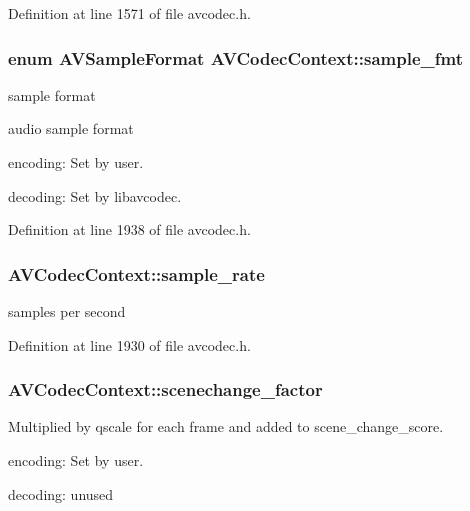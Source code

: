 Definition at line 1571 of file avcodec.\+h.

\subsubsection[{\texorpdfstring{sample\+\_\+fmt}{sample_fmt}}]{\setlength{\rightskip}{0pt plus 5cm}enum {\bf A\+V\+Sample\+Format} A\+V\+Codec\+Context\+::sample\+\_\+fmt}\hypertarget{struct_a_v_codec_context_a1bdba69ea111e2a9d03fdaa7a46a4c45}{}\label{struct_a_v_codec_context_a1bdba69ea111e2a9d03fdaa7a46a4c45}


sample format 

audio sample format
\begin{DoxyItemize}
\item encoding\+: Set by user.
\item decoding\+: Set by libavcodec. 
\end{DoxyItemize}

Definition at line 1938 of file avcodec.\+h.

\subsubsection[{\texorpdfstring{sample\+\_\+rate}{sample_rate}}]{ A\+V\+Codec\+Context\+::sample\+\_\+rate}\hypertarget{struct_a_v_codec_context_a8ff0b000c463361e234af48d03aadfc0}{}\label{struct_a_v_codec_context_a8ff0b000c463361e234af48d03aadfc0}


samples per second 



Definition at line 1930 of file avcodec.\+h.

\subsubsection[{\texorpdfstring{scenechange\+\_\+factor}{scenechange_factor}}]{ A\+V\+Codec\+Context\+::scenechange\+\_\+factor}\hypertarget{struct_a_v_codec_context_abc86ec1e352f31606d2124d88534997f}{}\label{struct_a_v_codec_context_abc86ec1e352f31606d2124d88534997f}
Multiplied by qscale for each frame and added to scene\+\_\+change\+\_\+score.
\begin{DoxyItemize}
\item encoding\+: Set by user.
\item decoding\+: unused 
\end{DoxyItemize}

